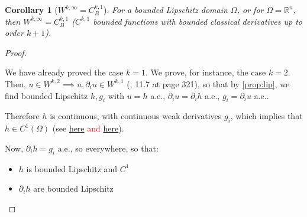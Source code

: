 \documentclass[english,a4paper,12pt,oneside]{scrbook}
\theoremstyle{break}
\newtheorem{cor}[equation]{Corollary}
\newenvironment{mproof}[1][\proofname]{%
  \begin{proof}[#1]$ $\par\nobreak\ignorespaces
}{%
  \end{proof}
}
\renewcommand*{\proofname}{Proof}
\theoremstyle{remark}
\newcommand{\mR}{\mathbb{R}}
\begin{document}
\begin{cor}[$W^{k,\infty}=C^{k,1}_B$]
\label{prop:lipk}
For a bounded Lipschitz domain $\Omega$, or for $\Omega = \mR^n$, then $W^{k,\infty}=C^{k,1}_B$ ($C^{k,1}$ bounded functions with bounded classical derivatives up to order $k+1$).
\end{cor}
\begin{mproof}

We have already proved the case $k=1$. We prove, for instance, the case $k=2$. Then, $u \in W^{k,2} \implies u, \partial_i u \in W^{k,1}$ (\cite{leoni}, 11.7 at page 321), so that by \cref{prop:lip}, we find bounded Lipschitz $h, g_i$ with $u=h$ a.e., $\partial_i u = \partial_i h$ a.e., $g_i = \partial_i u$ a.e..

Therefore $h$ is continuous, with continuous weak derivatives $g_i$, which implies that $h \in C^1(\Omega)$ (see \textcolor{red}{\href{https://math.stackexchange.com/questions/497708/is-a-continuous-function-with-continuous-weak-derivatives-of-class-c1}{here} and \href{https://math.stackexchange.com/questions/1787716/u-continuous-and-the-weak-derivative-du-continuous-rightarrow-u-in-c1}{here}}).

Now, $\partial_i h =g_i$ a.e., so everywhere, so that:

\begin{itemize}
\item $h$ is bounded Lipschitz and $C^1$
\item $\partial_i h$ are bounded Lipschitz
\end{itemize}


\end{mproof}
\end{document}
